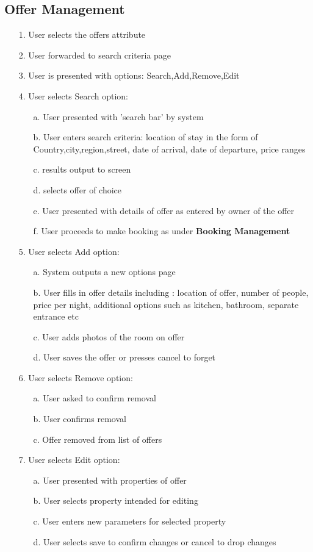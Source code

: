 \subsection {Offer Management}
\begin{itemize}
\item[1.] User selects the offers attribute 
\item[2.] User forwarded to search criteria page 
\item[3.] User is presented with options: Search,Add,Remove,Edit
\item[4.] User selects Search option:
	\begin{itemize}
		\item[a.] User presented with 'search bar' by system
		\item[b.] User enters search criteria: location of stay in the form of Country,city,region,street, date of arrival, date of departure, price ranges
		\item[c.] results output to screen
		\item[d.] selects offer of choice
		\item[e.] User presented with details of offer as entered by owner of the offer
		\item[f.] User proceeds to make booking as under \textbf{Booking Management}
	\end{itemize}
\item[5.]User selects Add option:
	\begin{itemize}
		\item[a.] System outputs a new options page
		\item[b.] User fills in offer details including : location of offer, number of people, price per night, additional options such as kitchen, bathroom, separate entrance etc
		\item[c.] User adds photos of the room on offer
		\item[d.] User saves the offer or presses cancel to forget
	\end{itemize}
\item[6.] User selects Remove option:
	\begin{itemize}
		\item[a.] User asked to confirm removal
		\item[b.] User confirms removal
		\item[c.] Offer removed from list of offers
	\end{itemize}
\item[7.] User selects Edit option:
	\begin{itemize}
		\item[a.] User presented with properties of offer
		\item[b.] User selects property intended for editing
		\item[c.] User enters new parameters for selected property
		\item[d.] User selects save to confirm changes or cancel to drop changes
	\end{itemize}
\end{itemize}
